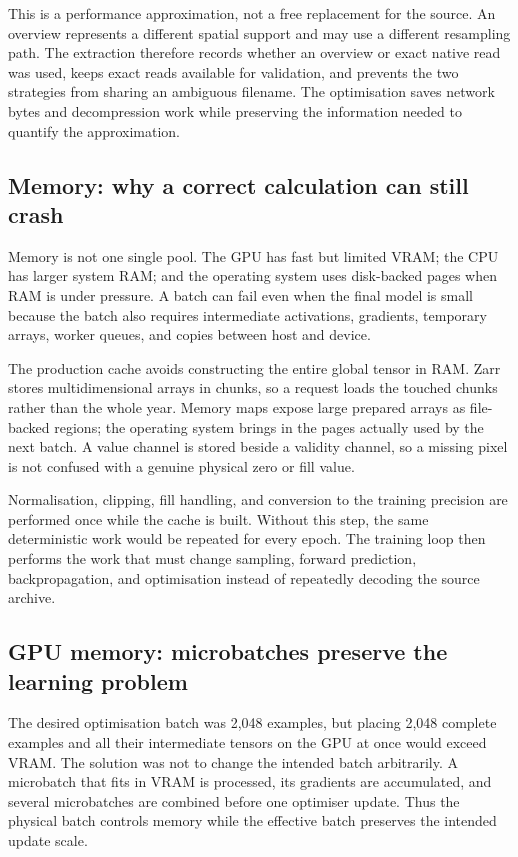 \documentclass[12pt,a4paper]{report}
\begin{document}
This is a performance approximation, not a free replacement for the source.
An overview represents a different spatial support and may use a different
resampling path. The extraction therefore records whether an overview or exact
native read was used, keeps exact reads available for validation, and prevents
the two strategies from sharing an ambiguous filename. The optimisation saves
network bytes and decompression work while preserving the information needed to
quantify the approximation.

\subsection{Memory: why a correct calculation can still crash}
Memory is not one single pool. The GPU has fast but limited VRAM; the CPU has
larger system RAM; and the operating system uses disk-backed pages when RAM is
under pressure. A batch can fail even when the final model is small because
the batch also requires intermediate activations, gradients, temporary arrays,
worker queues, and copies between host and device.

The production cache avoids constructing the entire global tensor in RAM.
Zarr stores multidimensional arrays in chunks, so a request loads the touched
chunks rather than the whole year. Memory maps expose large prepared arrays as
file-backed regions; the operating system brings in the pages actually used by
the next batch. A value channel is stored beside a validity channel, so a
missing pixel is not confused with a genuine physical zero or fill value.

Normalisation, clipping, fill handling, and conversion to the training
precision are performed once while the cache is built. Without this step, the
same deterministic work would be repeated for every epoch. The training loop
then performs the work that must change sampling, forward prediction,
backpropagation, and optimisation instead of repeatedly decoding the source
archive.

\subsection{GPU memory: microbatches preserve the learning problem}
The desired optimisation batch was 2,048 examples, but placing 2,048 complete
examples and all their intermediate tensors on the GPU at once would exceed
VRAM. The solution was not to change the intended batch arbitrarily. A
microbatch that fits in VRAM is processed, its gradients are accumulated, and
several microbatches are combined before one optimiser update. Thus the
physical batch controls memory while the effective batch preserves the
intended update scale.
\end{document}
